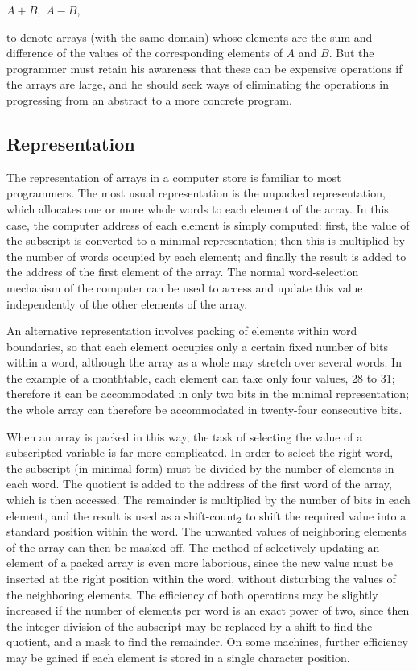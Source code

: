 \documentclass[twoside,11pt]{book}
\begin{document}
\quad $A + B,$ $A - B$,

to denote arrays (with the same domain) whose elements are the sum and difference of the values of the corresponding elements of $A$ and $B$. But the programmer must retain his awareness that these can be expensive operations if the arrays are large, and he should seek ways of eliminating the operations in progressing from an abstract to a more concrete program.

\subsection{Representation}
\label{sec:representation-6.2}

The representation of arrays in a computer store is familiar to most programmers. The most usual representation is the unpacked representation, which allocates one or more whole words to each element of the array. In this case, the computer address of each element is simply computed: first, the value of the subscript is converted to a minimal representation; then this is multiplied by the number of words occupied by each element; and finally the result is added to the address of the first element of the array. The normal word-selection mechanism of the computer can be used to access and update this value independently of the other elements of the array.

An alternative representation involves packing of elements within word boundaries, so that each element occupies only a certain fixed number of bits within a word, although the array as a whole may stretch over several words. In the example of a monthtable, each element can take only four values, 28 to 31; therefore it can be accommodated in only two bits in the minimal representation; the whole array can therefore be accommodated in twenty-four consecutive bits.

When an array is packed in this way, the task of selecting the value of a subscripted variable is far more complicated. In order to select the right word, the subscript (in minimal form) must be divided by the number of elements in each word. The quotient is added to the address of the first word of the array, which is then accessed. The remainder is multiplied by the number of bits in each element, and the result is used as a $\text{shift-count}_2$ to shift the required value into a standard position within the word. The unwanted values of neighboring elements of the array can then be masked off. The method of selectively updating an element of a packed array is even more laborious, since the new value must be inserted at the right position within the word, without disturbing the values of the neighboring elements. The efficiency of both operations may be slightly increased if the number of elements per word is an exact power of two, since then the integer division of the subscript may be replaced by a shift to find the quotient, and a mask to find the remainder. On some machines, further efficiency may be gained if each element is stored in a single character position.
\end{document}
